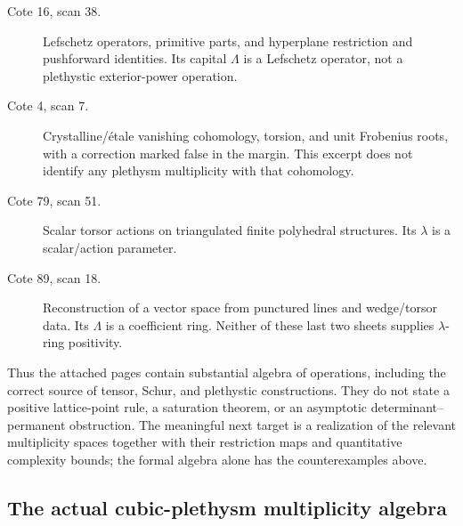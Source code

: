 \documentclass[11pt,a4paper]{article}
\begin{document}
\begin{description}
\item[Cote 16, scan 38.] Lefschetz operators, primitive parts, and
hyperplane restriction and pushforward identities. Its capital $\Lambda$ is a
Lefschetz operator, not a plethystic exterior-power operation.
\item[Cote 4, scan 7.] Crystalline/\'etale vanishing cohomology, torsion,
and unit Frobenius roots, with a correction marked false in the margin.
This excerpt does not identify any plethysm multiplicity with that
cohomology.
\item[Cote 79, scan 51.] Scalar torsor actions on triangulated finite
polyhedral structures. Its $\lambda$ is a scalar/action parameter.
\item[Cote 89, scan 18.] Reconstruction of a vector space from punctured
lines and wedge/torsor data. Its $\Lambda$ is a coefficient ring. Neither
of these last two sheets supplies $\lambda$-ring positivity.
\end{description}

Thus the attached pages contain substantial algebra of operations, including
the correct source of tensor, Schur, and plethystic constructions. They do
not state a positive lattice-point rule, a saturation theorem, or an
asymptotic determinant--permanent obstruction. The meaningful next target
is a realization of the relevant multiplicity spaces together with their
restriction maps and quantitative complexity bounds; the formal algebra
alone has the counterexamples above.


\subsection{The actual cubic-plethysm multiplicity algebra}
\end{document}
